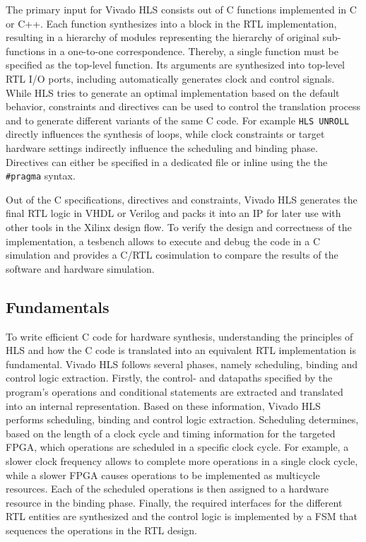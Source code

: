 The primary input for Vivado \ac{HLS} consists out of C functions implemented
in C or C++. Each function synthesizes into a block in the \ac{RTL}
implementation, resulting in a hierarchy of modules representing the hierarchy
of original sub-functions in a one-to-one correspondence. Thereby, a single
function must be specified as the top-level function. Its arguments are
synthesized into top-level \ac{RTL} I/O ports, including automatically
generates clock and control signals. While \ac{HLS} tries to generate an
optimal implementation based on the default behavior, constraints and
directives can be used to control the translation process and to generate
different variants of the same C code. For example \lstinline{HLS UNROLL}
directly influences the synthesis of loops, while clock constraints or target
hardware settings indirectly influence the scheduling and binding phase.
Directives can either be specified in a dedicated file or inline using the the
\lstinline{#pragma} syntax.

Out of the C specifications, directives and constraints, Vivado \ac{HLS}
generates the final \ac{RTL} logic in \ac{VHDL} or Verilog and packs it into
an \ac{IP} for later use with other tools in the Xilinx design flow. To verify
the design and correctness of the implementation, a tesbench allows to execute
and debug the code in a C simulation and provides a C/RTL cosimulation to
compare the results of the software and hardware simulation.

\subsection{Fundamentals}
To write efficient C code for hardware synthesis, understanding the principles
of \ac{HLS} and how the C code is translated into an equivalent \ac{RTL}
implementation is fundamental. Vivado \ac{HLS} follows several phases, namely
scheduling, binding and control logic extraction. Firstly, the control- and
datapaths specified by the program's operations and conditional statements are
extracted and translated into an internal representation. Based on these
information, Vivado HLS performs scheduling, binding and control logic
extraction. Scheduling determines, based on the length of a clock cycle and
timing information for the targeted \ac{FPGA}, which operations are scheduled
in a specific clock cycle. For example, a slower clock frequency allows to
complete more operations in a single clock cycle, while a slower \ac{FPGA}
causes operations to be implemented as multicycle resources. Each of the
scheduled operations is then assigned to a hardware resource in the binding
phase. Finally, the required interfaces for the different \ac{RTL} entities
are synthesized and the control logic is implemented by a \ac{FSM} that
sequences the operations in the \ac{RTL} design.

